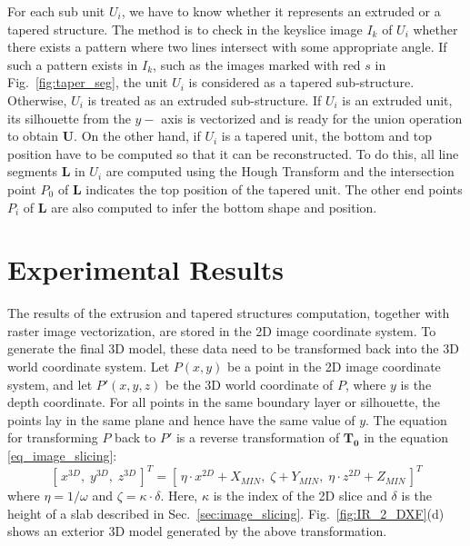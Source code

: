 \documentclass{acmsiggraph}                     %
\newcommand{\Fig}[1]{Fig.~\ref{fig:#1}}
\newcommand{\Sec}[1]{Sec.~\ref{sec:#1}}
\newcommand{\Figd}[1]{Fig.~\ref{fig:#1}(d)}
\begin{document}
For each sub unit $U_i$, we have to know whether it represents an extruded or a tapered
structure. The method is to check in the keyslice image $I_k$ of $U_i$ whether there exists
a pattern where two lines intersect with some appropriate angle.
If such a pattern exists in $I_k$, such as the images marked with red $s$ in \Fig{taper_seg},
the unit $U_i$ is considered as a tapered sub-structure. Otherwise, $U_i$ is treated as
an extruded sub-structure. If $U_i$ is an extruded unit, its silhouette from the
$y-$ axis is vectorized and is ready for the union operation to obtain $\boldsymbol{U}$.
On the other hand, if $U_i$ is a tapered unit, the bottom and top position have to be computed
so that it can be reconstructed. To do this, all line segments $\boldsymbol{L}$ in $U_i$
are computed using the Hough Transform and the
intersection point $P_0$ of $\boldsymbol{L}$ indicates
the top position of the tapered unit. The other end points $P_i$ of $\boldsymbol{L}$ are also computed
to infer the bottom shape and position.

\section{Experimental Results}
\label{sec:IR_OUT}
The results of the extrusion and tapered structures computation,
together with raster image vectorization, are stored in the 2D
image coordinate system. To generate the final 3D model, these
data need to be transformed
back into the 3D world coordinate system.
Let $P(x,y)$ be a point in the 2D image coordinate system, and let
$P'(x,y,z)$ be the 3D world coordinate of $P$, where $y$ is the depth coordinate.
For all points in the same boundary layer or silhouette,
the points lay in the same plane and hence have the same value of $y$.
The equation for transforming $P$ back to $P'$ is a reverse transformation of $\boldsymbol{T_0}$
in the equation \ref{eq_image_slicing}:
\begin{equation}\label{eq_ir2dxf}
[\,x^{3D},\; y^{3D},\; z^{3D}\,]^T = [\,\eta\cdot x^{2D} + X_{MIN},\; \zeta + Y_{MIN},\; \eta\cdot z^{2D} + Z_{MIN}\,]^T
\end{equation}
where $\eta=1/\omega$ and $\zeta=\kappa\cdot\delta$. Here, $\kappa$ is the index of the 2D slice and $\delta$
is the height of a slab described in \Sec{image_slicing}.
\Figd{IR_2_DXF} shows an exterior 3D model generated by the above
transformation.
\end{document}
